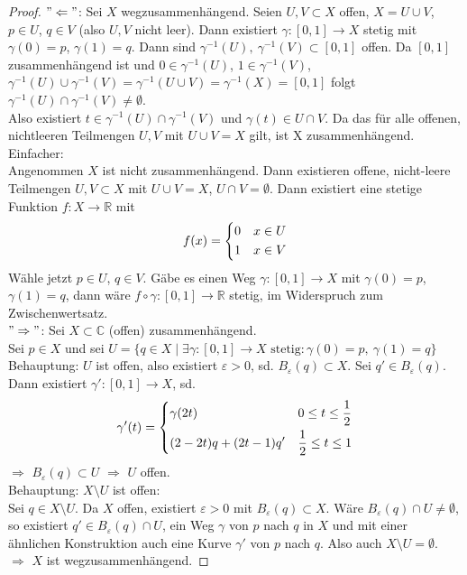 \documentclass[11pt,titlepage]{article}
\theoremstyle{definition}
\theoremstyle{remark}
\begin{document}
	\begin{proof}
		$"\Leftarrow"$: Sei $X$ wegzusammenhängend. Seien $U,V\subset X$ offen, $X=U\cup V$, 
		$p\in U$, $q\in V$ (also $U,V$ nicht leer). Dann existiert $\gamma :[0,1]\to X$ stetig mit 
		$\gamma (0)=p$, $\gamma (1)=q$. Dann sind $\gamma ^{-1}(U),\ \gamma^{-1}(V)\subset 
    		[0,1]$ offen. Da $[0,1]$ zusammenhängend ist und $0\in \gamma^{-1}(U)$, 
		$1\in \gamma^{-1}(V)$, \\
		$\gamma^{-1}(U)\cup\gamma^{-1}(V)=\gamma^{-1}(U\cup V)=\gamma^{-1}(X)=[0,1]$ folgt 
		$\gamma^{-1}(U)\cap \gamma^{-1}(V) \neq \emptyset$. \\Also existiert $t\in \gamma^{-1}(U)
		\cap\gamma^{-1}(V)$ und $\gamma(t)\in U\cap V$. Da das für alle offenen, nichtleeren 
		Teilmengen $U,V$ mit $U\cup V=X$ gilt, ist X zusammenhängend.\\
		Einfacher: \\
		Angenommen $X$ ist nicht zusammenhängend. Dann existieren offene, nicht-leere Teilmengen 
		$U,V\subset X$ mit $U\cup V=X$, $U\cap V=\emptyset$. Dann existiert eine stetige Funktion 
		$f:X\to \mathbb{R}$ mit 
		\[ f(x)= \begin{dcases} 0 & x\in U \\ 1& x\in V \end{dcases} \]
		Wähle jetzt $p\in U$, $q\in V$. Gäbe es einen Weg $\gamma : [0,1]\to X$ mit $\gamma(0)=p$, 
		$\gamma(1)=q$, dann wäre $f\circ \gamma :[0,1]\to \mathbb{R}$ stetig, im Widerspruch zum 
		Zwischenwertsatz. \\
		$"\Rightarrow"$: Sei $X\subset \mathbb{C}$ (offen) zusammenhängend. \\Sei $p\in X$ und sei 
		$U=\{ q\in X \mid \exists \gamma :[0,1]\to X \text{ stetig}:\gamma(0)=p,\ \gamma(1)=q \}$\\
		Behauptung: $U$ ist offen, also existiert $\varepsilon>0$, sd. $B_{\varepsilon}(q)\subset X$. 
		Sei $q'\in B_{\varepsilon}(q)$. Dann existiert $\gamma':[0,1]\to X$, sd. 
		\[ \gamma'(t)= \begin{dcases} \gamma(2t) & 0\leq t\leq \frac{1}{2} \\ (2-2t)q + (2t-1)q' & 
			\frac{1}{2} \leq t\leq 1 \end{dcases} \]
		$\Rightarrow$ $B_{\varepsilon}(q)\subset U$ $\Rightarrow$ $U$ offen.\\
		Behauptung: $X\setminus U$ ist offen: \\
		Sei $q\in X\setminus U$. Da $X$ offen, existiert $\varepsilon >0$ mit 
		$B_{\varepsilon}(q)\subset X$. Wäre $B_{\varepsilon}(q)\cap U \neq \emptyset$, so existiert 
		$q'\in B_{\varepsilon}(q)\cap U$, ein Weg $\gamma$ von $p$ nach $q$ in $X$ und mit einer 
		ähnlichen Konstruktion auch eine Kurve $\gamma'$ von $p$ nach $q$. Also auch 
		$X\setminus U = \emptyset$.\\
		$\Rightarrow$ $X$ ist wegzusammenhängend.	
	\end{proof}
	
\end{document}
